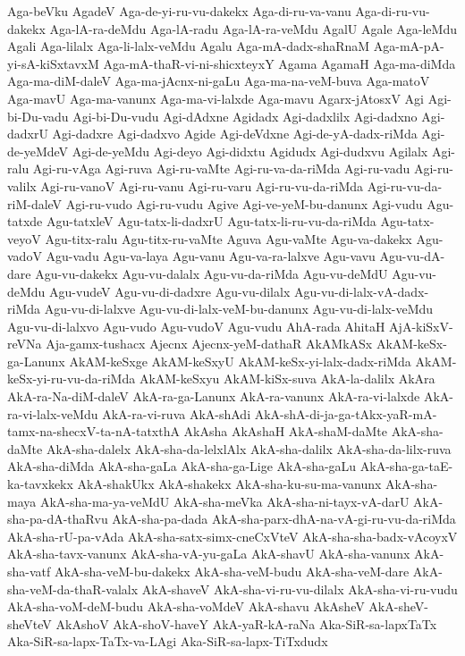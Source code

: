 {Aga-beVku
AgadeV
Aga-de-yi-ru-vu-dakekx
Aga-di-ru-va-vanu
Aga-di-ru-vu-dakekx
Aga-lA-ra-deMdu
Aga-lA-radu
Aga-lA-ra-veMdu
AgalU
Agale
Aga-leMdu
Agali
Aga-lilalx
Aga-li-lalx-veMdu
Agalu
Aga-mA-dadx-shaRnaM
Aga-mA-pA-yi-sA-kiSxtavxM
Aga-mA-thaR-vi-ni-shicxteyxY
Agama
AgamaH
Aga-ma-diMda
Aga-ma-diM-daleV
Aga-ma-jAcnx-ni-gaLu
Aga-ma-na-veM-buva
Aga-matoV
Aga-mavU
Aga-ma-vanunx
Aga-ma-vi-lalxde
Aga-mavu
Agarx-jAtosxV
Agi
Agi-bi-Du-vadu
Agi-bi-Du-vudu
Agi-dAdxne
Agidadx
Agi-dadxlilx
Agi-dadxno
Agi-dadxrU
Agi-dadxre
Agi-dadxvo
Agide
Agi-deVdxne
Agi-de-yA-dadx-riMda
Agi-de-yeMdeV
Agi-de-yeMdu
Agi-deyo
Agi-didxtu
Agidudx
Agi-dudxvu
Agilalx
Agi-ralu
Agi-ru-vAga
Agi-ruva
Agi-ru-vaMte
Agi-ru-va-da-riMda
Agi-ru-vadu
Agi-ru-valilx
Agi-ru-vanoV
Agi-ru-vanu
Agi-ru-varu
Agi-ru-vu-da-riMda
Agi-ru-vu-da-riM-daleV
Agi-ru-vudo
Agi-ru-vudu
Agive
Agi-ve-yeM-bu-danunx
Agi-vudu
Agu-tatxde
Agu-tatxleV
Agu-tatx-li-dadxrU
Agu-tatx-li-ru-vu-da-riMda
Agu-tatx-veyoV
Agu-titx-ralu
Agu-titx-ru-vaMte
Aguva
Agu-vaMte
Agu-va-dakekx
Agu-vadoV
Agu-vadu
Agu-va-laya
Agu-vanu
Agu-va-ra-lalxve
Agu-vavu
Agu-vu-dA-dare
Agu-vu-dakekx
Agu-vu-dalalx
Agu-vu-da-riMda
Agu-vu-deMdU
Agu-vu-deMdu
Agu-vudeV
Agu-vu-di-dadxre
Agu-vu-dilalx
Agu-vu-di-lalx-vA-dadx-riMda
Agu-vu-di-lalxve
Agu-vu-di-lalx-veM-bu-danunx
Agu-vu-di-lalx-veMdu
Agu-vu-di-lalxvo
Agu-vudo
Agu-vudoV
Agu-vudu
AhA-rada
AhitaH
AjA-kiSxV-reVNa
Aja-gamx-tushacx
Ajecnx
Ajecnx-yeM-dathaR
AkAMkASx
AkAM-keSx-ga-Lanunx
AkAM-keSxge
AkAM-keSxyU
AkAM-keSx-yi-lalx-dadx-riMda
AkAM-keSx-yi-ru-vu-da-riMda
AkAM-keSxyu
AkAM-kiSx-suva
AkA-la-dalilx
AkAra
AkA-ra-Na-diM-daleV
AkA-ra-ga-Lanunx
AkA-ra-vanunx
AkA-ra-vi-lalxde
AkA-ra-vi-lalx-veMdu
AkA-ra-vi-ruva
AkA-shAdi
AkA-shA-di-ja-ga-tAkx-yaR-mA-tamx-na-shecxV-ta-nA-tatxthA
AkAsha
AkAshaH
AkA-shaM-daMte
AkA-sha-daMte
AkA-sha-dalelx
AkA-sha-da-lelxlAlx
AkA-sha-dalilx
AkA-sha-da-lilx-ruva
AkA-sha-diMda
AkA-sha-gaLa
AkA-sha-ga-Lige
AkA-sha-gaLu
AkA-sha-ga-taE-ka-tavxkekx
AkA-shakUkx
AkA-shakekx
AkA-sha-ku-su-ma-vanunx
AkA-sha-maya
AkA-sha-ma-ya-veMdU
AkA-sha-meVka
AkA-sha-ni-tayx-vA-darU
AkA-sha-pa-dA-thaRvu
AkA-sha-pa-dada
AkA-sha-parx-dhA-na-vA-gi-ru-vu-da-riMda
AkA-sha-rU-pa-vAda
AkA-sha-satx-simx-cneCxVteV
AkA-sha-sha-badx-vAcoyxV
AkA-sha-tavx-vanunx
AkA-sha-vA-yu-gaLa
AkA-shavU
AkA-sha-vanunx
AkA-sha-vatf
AkA-sha-veM-bu-dakekx
AkA-sha-veM-budu
AkA-sha-veM-dare
AkA-sha-veM-da-thaR-valalx
AkA-shaveV
AkA-sha-vi-ru-vu-dilalx
AkA-sha-vi-ru-vudu
AkA-sha-voM-deM-budu
AkA-sha-voMdeV
AkA-shavu
AkAsheV
AkA-sheV-sheVteV
AkAshoV
AkA-shoV-haveY
AkA-yaR-kA-raNa
Aka-SiR-sa-lapxTaTx
Aka-SiR-sa-lapx-TaTx-va-LAgi
Aka-SiR-sa-lapx-TiTxdudx
}
